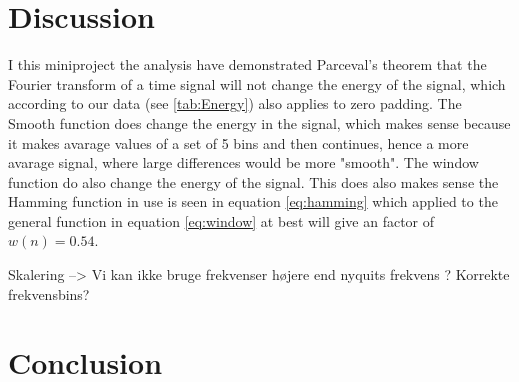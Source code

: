 

\section{Discussion}

I this miniproject the analysis have demonstrated Parceval's theorem that the Fourier transform of a time signal will not change the energy of the signal, which according to our data (see \ref{tab:Energy}) also applies to zero padding. The Smooth function does change the energy in the signal, which makes sense because it makes avarage values of a set of 5 bins and then continues, hence a more avarage signal, where large differences would be more "smooth". The window function do also change the energy of the signal. This does also makes sense the Hamming function in use is seen in equation \eqref{eq:hamming} which applied to the general function in equation \eqref{eq:window} at best will give an factor of $w(n)=0.54$. 


Skalering --> Vi kan ikke bruge frekvenser højere end nyquits frekvens ?
Korrekte frekvensbins?

\section{Conclusion}